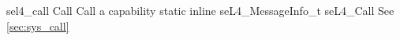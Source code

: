 %
%
%
%

\apidoc
{sel4_call}
{Call}
{Call a capability}
{static inline seL4\_MessageInfo\_t seL4\_Call}
{
}
{\messageinforetdesc}
{See \autoref{sec:sys_call} }
